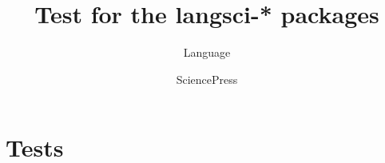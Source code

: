 \documentclass[output=book
  ,nonflat
  ,modfonts,
  ,colorlinks
  ,showindex
  ,draftmode
  ,nobabel
  ,booklanguage=french
  ]{langsci/langscibook}
\title{Test for the langsci-* packages}
\author{Language\and Science\lastand Press}
\begin{document}
\maketitle 
\tableofcontents
\mainmatter

\chapter{Tests} 
% 
% 
% 
% 
% 
% 
% 
% 
% 
% 
%  
% 
% 
% 
% 
% 
%  
% 
% 
%  
% 
%  
% 
% 
% 
%   
\end{document}
